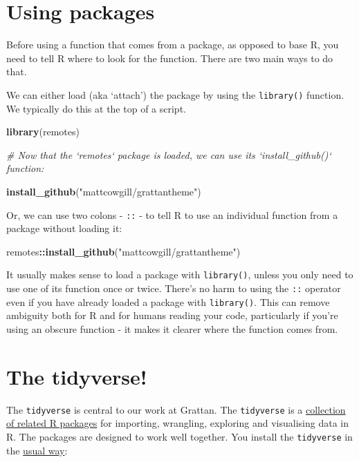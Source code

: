 \documentclass[]{book}
\newenvironment{Shaded}{\begin{snugshade}}{\end{snugshade}}
\newcommand{\CommentTok}[1]{\textcolor[rgb]{0.56,0.35,0.01}{\textit{#1}}}
\newcommand{\KeywordTok}[1]{\textcolor[rgb]{0.13,0.29,0.53}{\textbf{#1}}}
\newcommand{\NormalTok}[1]{#1}
\newcommand{\OperatorTok}[1]{\textcolor[rgb]{0.81,0.36,0.00}{\textbf{#1}}}
\newcommand{\StringTok}[1]{\textcolor[rgb]{0.31,0.60,0.02}{#1}}
\begin{document}
\hypertarget{using-packages}{%
\section{Using packages}\label{using-packages}}

Before using a function that comes from a package, as opposed to base R, you need to tell R where to look for the function. There are two main ways to do that.

We can either load (aka `attach') the package by using the \texttt{library()} function. We typically do this at the top of a script.

\begin{Shaded}
\begin{Highlighting}[]
\KeywordTok{library}\NormalTok{(remotes)}

\CommentTok{# Now that the `remotes` package is loaded, we can use its `install_github()` function:}

\KeywordTok{install_github}\NormalTok{(}\StringTok{"mattcowgill/grattantheme"}\NormalTok{)}
\end{Highlighting}
\end{Shaded}

Or, we can use two colons - \texttt{::} - to tell R to use an individual function from a package without loading it:

\begin{Shaded}
\begin{Highlighting}[]
\NormalTok{remotes}\OperatorTok{::}\KeywordTok{install_github}\NormalTok{(}\StringTok{"mattcowgill/grattantheme"}\NormalTok{)}
\end{Highlighting}
\end{Shaded}

It usually makes sense to load a package with \texttt{library()}, unless you only need to use one of its function once or twice. There's no harm to using the \texttt{::} operator even if you have already loaded a package with \texttt{library()}. This can remove ambiguity both for R and for humans reading your code, particularly if you're using an obscure function - it makes it clearer where the function comes from.

\hypertarget{tidyverse}{%
\section{The tidyverse!}\label{tidyverse}}

The \texttt{tidyverse} is central to our work at Grattan. The \texttt{tidyverse} is a \href{https://www.tidyverse.org/packages/}{collection of related R packages} for importing, wrangling, exploring and visualising data in R. The packages are designed to work well together. You install the \texttt{tidyverse} in the \protect\hyperlink{install-packages}{usual way}:
\end{document}
